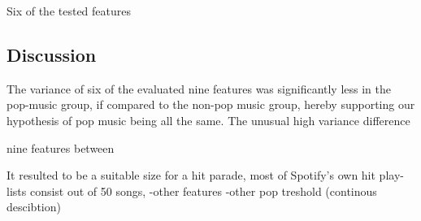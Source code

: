 \documentclass{article}
\begin{document}



Six of the tested features  %

\subsection{Discussion}
The variance of six of the evaluated nine features was significantly less in the pop-music group, if compared to the non-pop music group, hereby supporting our hypothesis of pop music being all the same.  
The unusual high variance difference 


nine features between 




 It resulted  to be a suitable size for a hit parade, most of Spotify's own hit play-lists consist out of 50 songs, 
-other features
-other pop treshold (continous descibtion)



\end{document}
